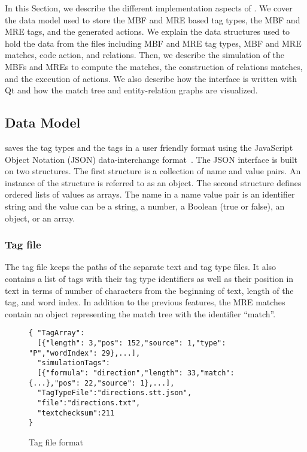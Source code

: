 In this Section, we describe the different implementation aspects of \framework. 
We cover the data model used to store the MBF and MRE based tag types, the MBF and MRE tags, and the generated actions. 
We explain the data structures used to hold the data from the files including MBF and MRE tag types, MBF and MRE matches, code action, and relations. 
Then, we describe the simulation of the MBFs and MREs to compute the matches, the construction of relations matches, and the execution of actions. 
We also describe how the interface is written with Qt and how the match tree and entity-relation graphs are visualized.

\subsection{Data Model}

\framework saves the tag types and the tags in a user friendly format using
the JavaScript Object Notation (JSON) data-interchange format~\cite{nolan2014javascript}.
The JSON interface is built on two structures.
The first structure is a collection of name and value pairs. An instance
of the structure is referred to as an object. 
The second structure defines ordered lists of values as arrays. 
The name in a name value pair is an identifier string 
and the value can be a string, a number, a Boolean (true or false), an object, 
or an array. 

\subsubsection{Tag file}

The tag file keeps the paths of the separate text and tag type files. 
It also contains a list of tags with their tag type identifiers as well 
as their position in text in terms of number of characters from the beginning 
of text, length of the tag, and word index. 
In addition to the previous features, 
the MRE matches contain an object representing the match tree with 
the identifier ``match''.

\begin{figure}[h*]
\begingroup
    \fontsize{8pt}{12pt}\selectfont
\begin{verbatim}
{ "TagArray":
  [{"length": 3,"pos": 152,"source": 1,"type": "P","wordIndex": 29},...],
  "simulationTags":
  [{"formula": "direction","length": 33,"match": {...},"pos": 22,"source": 1},...],
  "TagTypeFile":"directions.stt.json",
  "file":"directions.txt",
  "textchecksum":211
}
\end{verbatim}
\endgroup
\caption{Tag file format}
\label{fig:tagfile}
\end{figure}

